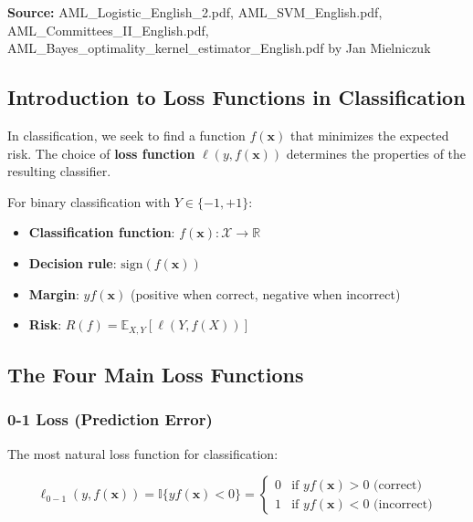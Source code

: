 \documentclass[12pt,a4paper]{article}
\begin{document}
\textbf{Source:} AML\_Logistic\_English\_2.pdf, AML\_SVM\_English.pdf, AML\_Committees\_II\_English.pdf, AML\_Bayes\_optimality\_kernel\_estimator\_English.pdf by Jan Mielniczuk

\subsection{Introduction to Loss Functions in Classification}

In classification, we seek to find a function $f(\mathbf{x})$ that minimizes the expected risk. The choice of \textbf{loss function} $\ell(y, f(\mathbf{x}))$ determines the properties of the resulting classifier.

\begin{tcolorbox}[colback=blue!5!white,colframe=blue!75!black,title=General Framework]
For binary classification with $Y \in \{-1, +1\}$:
\begin{itemize}
    \item \textbf{Classification function}: $f(\mathbf{x}) : \mathcal{X} \to \mathbb{R}$
    \item \textbf{Decision rule}: $\text{sign}(f(\mathbf{x}))$
    \item \textbf{Margin}: $yf(\mathbf{x})$ (positive when correct, negative when incorrect)
    \item \textbf{Risk}: $R(f) = \mathbb{E}_{X,Y}[\ell(Y, f(X))]$
\end{itemize}
\end{tcolorbox}

\subsection{The Four Main Loss Functions}

\subsubsection{0-1 Loss (Prediction Error)}

The most natural loss function for classification:

\begin{equation}
\ell_{0-1}(y, f(\mathbf{x})) = \mathbb{I}\{yf(\mathbf{x}) < 0\} = \begin{cases}
0 & \text{if } yf(\mathbf{x}) > 0 \text{ (correct)} \\
1 & \text{if } yf(\mathbf{x}) < 0 \text{ (incorrect)}
\end{cases}
\end{equation}
\end{document}
